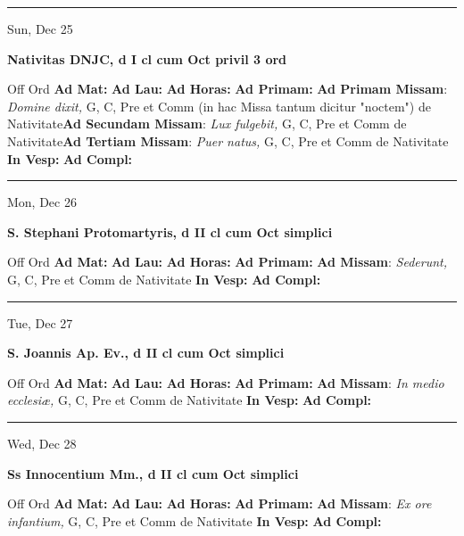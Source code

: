 \documentclass[letterpaper, 10pt]{article}
\begin{document}
\hrule
\begin{center}
Sun, Dec 25
\end{center}\textbf{ \large Nativitas DNJC, \textnormal{\normalsize d I cl cum Oct privil 3 ord}}
\begin{justify}
Off Ord
\textbf{Ad Mat: }
\textbf{Ad Lau: }
\textbf{Ad Horas: }
\textbf{Ad Primam: }
\textbf{Ad Primam Missam}: \textit{Domine dixit,} G, C, Pre et Comm (in hac Missa tantum dicitur "noctem") de Nativitate\textbf{Ad Secundam Missam}: \textit{Lux fulgebit,} G, C, Pre et Comm de Nativitate\textbf{Ad Tertiam Missam}: \textit{Puer natus,} G, C, Pre et Comm de Nativitate
\textbf{In Vesp: }
\textbf{Ad Compl: }\end{justify}



\hrule
\begin{center}
Mon, Dec 26
\end{center}\textbf{ \large S. Stephani Protomartyris, \textnormal{\normalsize d II cl cum Oct simplici}}
\begin{justify}
Off Ord
\textbf{Ad Mat: }
\textbf{Ad Lau: }
\textbf{Ad Horas: }
\textbf{Ad Primam: }
\textbf{Ad Missam}: \textit{Sederunt,} G, C, Pre et Comm de Nativitate
\textbf{In Vesp: }
\textbf{Ad Compl: }\end{justify}



\hrule
\begin{center}
Tue, Dec 27
\end{center}\textbf{ \large S. Joannis Ap. Ev., \textnormal{\normalsize d II cl cum Oct simplici}}
\begin{justify}
Off Ord
\textbf{Ad Mat: }
\textbf{Ad Lau: }
\textbf{Ad Horas: }
\textbf{Ad Primam: }
\textbf{Ad Missam}: \textit{In medio ecclesiæ,} G, C, Pre et Comm de Nativitate
\textbf{In Vesp: }
\textbf{Ad Compl: }\end{justify}



\hrule
\begin{center}
Wed, Dec 28
\end{center}\textbf{ \large Ss Innocentium Mm., \textnormal{\normalsize d II cl cum Oct simplici}}
\begin{justify}
Off Ord
\textbf{Ad Mat: }
\textbf{Ad Lau: }
\textbf{Ad Horas: }
\textbf{Ad Primam: }
\textbf{Ad Missam}: \textit{Ex ore infantium,} G, C, Pre et Comm de Nativitate
\textbf{In Vesp: }
\textbf{Ad Compl: }\end{justify}
\end{document}
